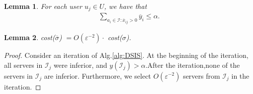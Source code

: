 \documentclass[journal]{IEEEtran}
\newtheorem{lemma}{Lemma}
\begin{document}
\begin{lemma}
	For each user $u_j \in U$, we have that
	\begin{eqnarray}
		\label{eq10}
		\sum\limits_{{a_i} \in \mathcal{I}:{{\overline x }_{ij}} > 0} {{{\overline y }_i}}  \le \alpha .
	\end{eqnarray}
\end{lemma}

\begin{lemma}
	cost($\overline \sigma$) $= O(\varepsilon^{-2} )\cdot$ cost($\sigma$).
\end{lemma}

\begin{proof}
	Consider an iteration of Alg.\ref{alg:DSIS}. At the beginning of the iteration, all servers in $\mathcal{I}_j$ were inferior, and $y(\mathcal{I}_j) > \alpha$.After the iteration,none of the servers in $\mathcal{I}_j$ are inferior. Furthermore, we select $O(\varepsilon^{-2})$ servers from $\mathcal{I}_j$ in the iteration.
\end{proof}
\end{document}
